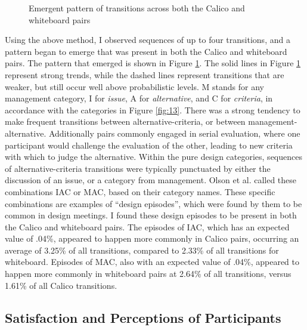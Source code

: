 \documentclass[12pt,fleqn]{ucithesis}
\begin{document}
\begin{figure}
  \centering
\caption{Emergent pattern of transitions across both the Calico and whiteboard pairs}
\label{fig:14}       %
\end{figure}

Using the above method, I observed sequences of up to four transitions, and a pattern began to emerge that was present in both the Calico and whiteboard pairs. The pattern that emerged is shown in Figure \ref{fig:14}. The solid lines in Figure \ref{fig:14} represent strong trends, while the dashed lines represent transitions that are weaker, but still occur well above probabilistic levels. M stands for any management category, I for \emph{issue}, A for \emph{alternative}, and C for \emph{criteria}, in accordance with the categories in Figure \ref{fig:13}. There was a strong tendency to make frequent transitions between alternative-criteria, or between management-alternative. Additionally pairs commonly engaged in serial evaluation, where one participant would challenge the evaluation of the other, leading to new criteria with which to judge the alternative. Within the pure design categories, sequences of alternative-criteria transitions were typically punctuated by either the discussion of an issue, or a category from management. Olson et al. called these combinations IAC or MAC, based on their category names. These specific combinations are examples of ``design episodes'', which were found by them to be common in design meetings. I found these design episodes to be present in both the Calico and whiteboard pairs. The episodes of IAC, which has an expected value of .04\%, appeared to happen more commonly in Calico pairs, occurring an average of 3.25\% of all transitions, compared to 2.33\% of all transitions for whiteboard. Episodes of MAC, also with an expected value of .04\%, appeared to happen more commonly in whiteboard pairs at 2.64\% of all transitions, versus 1.61\% of all Calico transitions. 

\subsection {Satisfaction and Perceptions of Participants}
\label{results:3}
\end{document}
